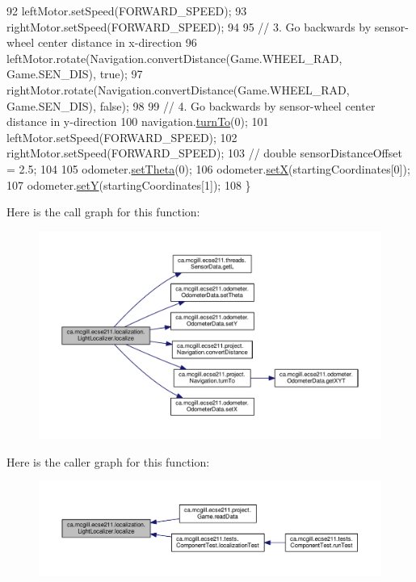 \begin{DoxyCode}
92     leftMotor.setSpeed(FORWARD\_SPEED);
93     rightMotor.setSpeed(FORWARD\_SPEED);
94 
95     \textcolor{comment}{// 3. Go backwards by sensor-wheel center distance in x-direction}
96     leftMotor.rotate(Navigation.convertDistance(Game.WHEEL\_RAD, Game.SEN\_DIS), \textcolor{keyword}{true});
97     rightMotor.rotate(Navigation.convertDistance(Game.WHEEL\_RAD, Game.SEN\_DIS), \textcolor{keyword}{false});
98 
99     \textcolor{comment}{// 4. Go backwards by sensor-wheel center distance in y-direction}
100     navigation.\hyperlink{classca_1_1mcgill_1_1ecse211_1_1project_1_1_navigation_a3bbe0645f2b3b3d0986b4a707fb5a00c}{turnTo}(0);
101     leftMotor.setSpeed(FORWARD\_SPEED);
102     rightMotor.setSpeed(FORWARD\_SPEED);
103     \textcolor{comment}{// double sensorDistanceOffset = 2.5;}
104 
105     odometer.\hyperlink{classca_1_1mcgill_1_1ecse211_1_1odometer_1_1_odometer_data_a419b8f07c2c5374411c8e62298e9a402}{setTheta}(0);
106     odometer.\hyperlink{classca_1_1mcgill_1_1ecse211_1_1odometer_1_1_odometer_data_a2911d7215e47f3064defe016b46bfeef}{setX}(startingCoordinates[0]);
107     odometer.\hyperlink{classca_1_1mcgill_1_1ecse211_1_1odometer_1_1_odometer_data_a82986438cd462e66520bc62bb4bd2b75}{setY}(startingCoordinates[1]);
108   \}
\end{DoxyCode}
Here is the call graph for this function\+:
\nopagebreak
\begin{figure}[H]
\begin{center}
\leavevmode
\includegraphics[width=350pt]{classca_1_1mcgill_1_1ecse211_1_1localization_1_1_light_localizer_afb295ca8cd6623ac3e9eacb1d31b75b9_cgraph}
\end{center}
\end{figure}
Here is the caller graph for this function\+:
\nopagebreak
\begin{figure}[H]
\begin{center}
\leavevmode
\includegraphics[width=350pt]{classca_1_1mcgill_1_1ecse211_1_1localization_1_1_light_localizer_afb295ca8cd6623ac3e9eacb1d31b75b9_icgraph}
\end{center}
\end{figure}


